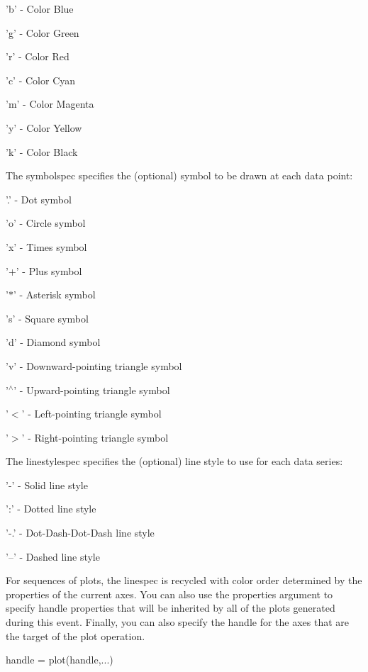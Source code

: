 \begin{DoxyItemize}
\item {\ttfamily 'b'} -\/ Color Blue  
\item {\ttfamily 'g'} -\/ Color Green  
\item {\ttfamily 'r'} -\/ Color Red  
\item {\ttfamily 'c'} -\/ Color Cyan  
\item {\ttfamily 'm'} -\/ Color Magenta  
\item {\ttfamily 'y'} -\/ Color Yellow  
\item {\ttfamily 'k'} -\/ Color Black  
\end{DoxyItemize}The {\ttfamily symbolspec} specifies the (optional) symbol to be drawn at each data point\-: 
\begin{DoxyItemize}
\item {\ttfamily '.'} -\/ Dot symbol  
\item {\ttfamily 'o'} -\/ Circle symbol  
\item {\ttfamily 'x'} -\/ Times symbol  
\item {\ttfamily '+'} -\/ Plus symbol  
\item {\ttfamily '$\ast$'} -\/ Asterisk symbol  
\item {\ttfamily 's'} -\/ Square symbol  
\item {\ttfamily 'd'} -\/ Diamond symbol  
\item {\ttfamily 'v'} -\/ Downward-\/pointing triangle symbol  
\item {\ttfamily '$^\wedge$'} -\/ Upward-\/pointing triangle symbol  
\item {\ttfamily '$<$'} -\/ Left-\/pointing triangle symbol  
\item {\ttfamily '$>$'} -\/ Right-\/pointing triangle symbol  
\end{DoxyItemize}The {\ttfamily linestylespec} specifies the (optional) line style to use for each data series\-: 
\begin{DoxyItemize}
\item {\ttfamily '-\/'} -\/ Solid line style  
\item {\ttfamily '\-:'} -\/ Dotted line style  
\item {\ttfamily '-\/.'} -\/ Dot-\/\-Dash-\/\-Dot-\/\-Dash line style  
\item {\ttfamily '--'} -\/ Dashed line style  
\end{DoxyItemize}For sequences of plots, the {\ttfamily linespec} is recycled with color order determined by the properties of the current axes. You can also use the {\ttfamily properties} argument to specify handle properties that will be inherited by all of the plots generated during this event. Finally, you can also specify the handle for the axes that are the target of the {\ttfamily plot} operation. \begin{DoxyVerb}  handle = plot(handle,...)
\end{DoxyVerb}
